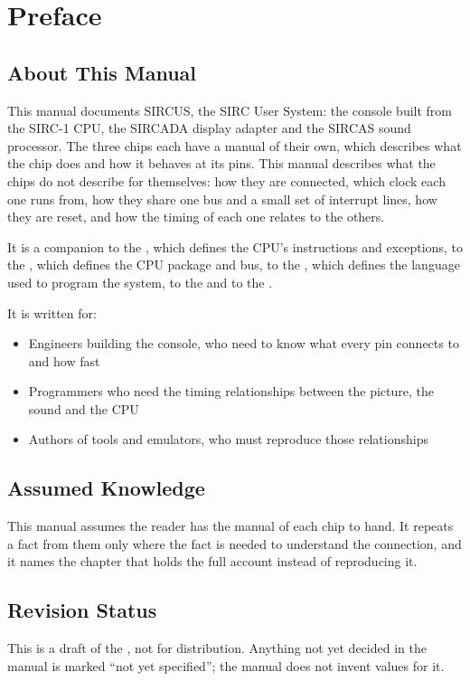 \chapter*{Preface}
\label{ch:preface}

\section*{About This Manual}

This manual documents SIRCUS, the SIRC User System: the console built from the SIRC-1 CPU, the SIRCADA display adapter
and the SIRCAS sound processor. The three chips each have a manual of their own, which describes what the chip does and
how it behaves at its pins. This manual describes what the chips do not describe for themselves: how they are
connected, which clock each one runs from, how they share one bus and a small set of interrupt lines, how they are
reset, and how the timing of each one relates to the others.

It is a companion to the \archmanual{}, which defines the CPU's instructions and exceptions, to the \hwmanual{}, which
defines the CPU package and bus, to the \asmmanual{}, which defines the language used to program the system, to the
\videomanual{} and to the \audiomanual{}.

It is written for:

\begin{itemize}
	\item Engineers building the console, who need to know what every pin connects to and how fast
	\item Programmers who need the timing relationships between the picture, the sound and the CPU
	\item Authors of tools and emulators, who must reproduce those relationships
\end{itemize}

\section*{Assumed Knowledge}

This manual assumes the reader has the manual of each chip to hand. It repeats a fact from them only where the fact is
needed to understand the connection, and it names the chapter that holds the full account instead of reproducing it.

\section*{Revision Status}

This is a draft of the \sysmanual{}, not for distribution. Anything not yet decided in the manual is marked ``not yet
specified''; the manual does not invent values for it.
